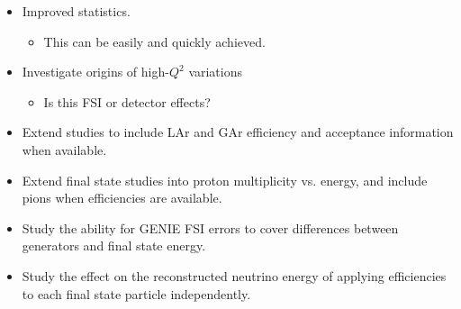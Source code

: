 \documentclass[12pt]{article}
\begin{document}
\begin{itemize}

\item Improved statistics.
	\begin{itemize}
		\item This can be easily and quickly achieved.
	\end{itemize}
\item Investigate origins of high-$Q^2$ variations
	\begin{itemize}
		\item Is this FSI or detector effects?
	\end{itemize}
\item Extend studies to include LAr and GAr efficiency and acceptance information when available.
\item Extend final state studies into proton multiplicity vs. energy, and include pions when efficiencies are available.
\item Study the ability for GENIE FSI errors to cover differences between generators and final state energy.
\item Study the effect on the reconstructed neutrino energy of applying efficiencies to each final state particle independently.

\end{itemize}


\appendix

%
%
%
%
%
%
%
%

%
\end{document}
